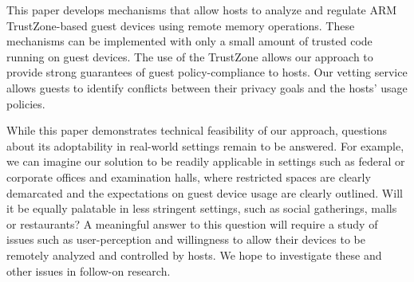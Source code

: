 \label{section:conclusions}


This paper develops mechanisms that allow hosts to analyze and regulate ARM
TrustZone-based guest devices using remote memory operations.  These mechanisms
can be implemented with only a small amount of trusted code running on guest
devices. The use of the TrustZone allows our approach to provide strong
guarantees of guest policy-compliance to hosts. Our vetting service allows
guests to identify conflicts between their privacy goals and the hosts' usage
policies. 

While this paper demonstrates technical feasibility of our approach, questions
about its adoptability in real-world settings remain to be answered. For
example, we can imagine our solution to be readily applicable in settings such
as federal or corporate offices and examination halls, where restricted spaces
are clearly demarcated and the expectations on guest device usage are clearly
outlined.  Will it be equally palatable in less stringent settings, such as
social gatherings, malls or restaurants? A meaningful answer to this question
will require a study of issues such as user-perception and willingness to allow
their devices to be remotely analyzed and controlled by hosts. We hope to 
investigate these and other issues in follow-on research.


% 
%
%
